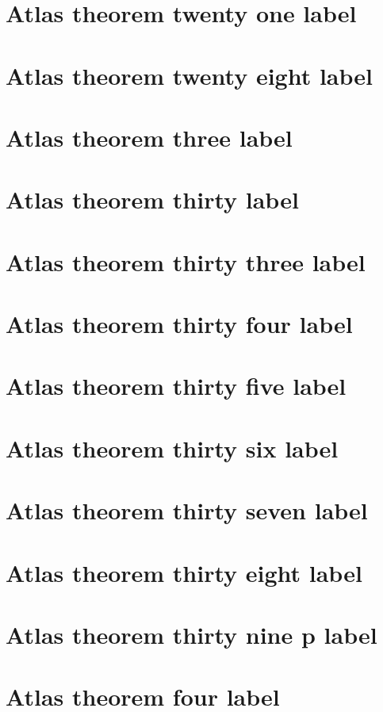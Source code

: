 \documentclass[11pt]{article}
\theoremstyle{definition}
\begin{document}
\section{Atlas theorem twenty one label}
\label{ll:labels:atlas-t21}
\section{Atlas theorem twenty eight label}
\label{ll:labels:atlas-t28}
\section{Atlas theorem three label}
\label{ll:labels:atlas-t3}
\section{Atlas theorem thirty label}
\label{ll:labels:atlas-t30}
\section{Atlas theorem thirty three label}
\label{ll:labels:atlas-t33}
\section{Atlas theorem thirty four label}
\label{ll:labels:atlas-t34}
\section{Atlas theorem thirty five label}
\label{ll:labels:atlas-t35}
\section{Atlas theorem thirty six label}
\label{ll:labels:atlas-t36}
\section{Atlas theorem thirty seven label}
\label{ll:labels:atlas-t37}
\section{Atlas theorem thirty eight label}
\label{ll:labels:atlas-t38}
\section{Atlas theorem thirty nine p label}
\label{ll:labels:atlas-t39p}
\section{Atlas theorem four label}
\label{ll:labels:atlas-t4}
\end{document}
